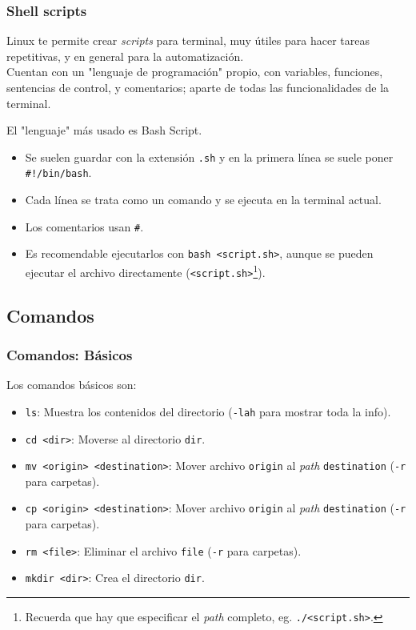 \documentclass[aspectratio=43]{beamer}
\begin{document}
\begin{frame}
    \frametitle{Shell scripts}
    
    Linux te permite crear \textit{scripts} para terminal, muy útiles para hacer tareas repetitivas, y en general para la automatización.\\
    Cuentan con un "lenguaje de programación" propio, con variables, funciones, sentencias de control, y comentarios; aparte de todas las funcionalidades de la terminal.\newline

    El "lenguaje" más usado es Bash Script.
    \begin{itemize}
        \item Se suelen guardar con la extensión \texttt{.sh} y en la primera línea se suele poner \texttt{\#!/bin/bash}.
        \item Cada línea se trata como un comando y se ejecuta en la terminal actual.
        \item Los comentarios usan \texttt{\#}.
        \item Es recomendable ejecutarlos con \texttt{bash <script.sh>}, aunque se pueden ejecutar el archivo directamente (\texttt{<script.sh>}\footnote{Recuerda que hay que especificar el \textit{path} completo, eg. \texttt{./<script.sh>}.}).
    \end{itemize}

\end{frame}


\subsection{Comandos}

\begin{frame}
    \frametitle{Comandos: Básicos}
    Los comandos básicos son:

    \begin{itemize}
        \item \texttt{ls}: Muestra los contenidos del directorio (\texttt{-lah} para mostrar toda la info).
        \item \texttt{cd <dir>}: Moverse al directorio \texttt{dir}.
        \item \texttt{mv <origin> <destination>}: Mover archivo \texttt{origin} al \textit{path} \texttt{destination} (\texttt{-r} para carpetas).
        \item \texttt{cp <origin> <destination>}: Mover archivo \texttt{origin} al \textit{path} \texttt{destination} (\texttt{-r} para carpetas).
        \item \texttt{rm <file>}: Eliminar el archivo \texttt{file} (\texttt{-r} para carpetas).
        \item \texttt{mkdir <dir>}: Crea el directorio \texttt{dir}.
    \end{itemize}
\end{frame}
\end{document}
